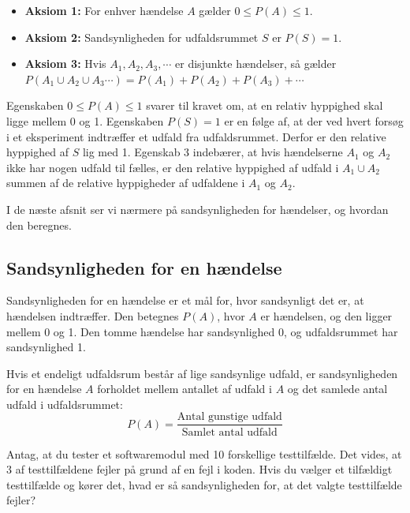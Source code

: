 \begin{axiom}
    \begin{itemize}
        \item \textbf{Aksiom 1:} For enhver hændelse \(A\) gælder \( 0 \leq P(A) \leq 1 \).
        \item \textbf{Aksiom 2:} Sandsynligheden for udfaldsrummet \(S\) er \(P(S) = 1\).
        \item \textbf{Aksiom 3:} Hvis \(A_1, A_2, A_3, \cdots\) er disjunkte hændelser, så gælder \(P\left(A_1 \cup A_2 \cup A_3 \cdots\right) = P\left(A_1\right) + P\left(A_2\right) + P\left(A_3\right) + \cdots\)
    \end{itemize}
\end{axiom}

Egenskaben \( 0 \leq P(A) \leq 1 \) svarer til kravet om, at en relativ hyppighed skal ligge mellem 0 og 1. Egenskaben \( P(S) = 1 \) er en følge af, at der ved hvert forsøg i et eksperiment indtræffer et udfald fra udfaldsrummet. Derfor er den relative hyppighed af \( S \) lig med 1. Egenskab 3 indebærer, at hvis hændelserne \( A_1 \) og \( A_2 \) ikke har nogen udfald til fælles, er den relative hyppighed af udfald i \( A_1 \cup A_2 \) summen af de relative hyppigheder af udfaldene i \( A_1 \) og \( A_2 \).

I de næste afsnit ser vi nærmere på sandsynligheden for hændelser, og hvordan den beregnes.

\subsection*{Sandsynligheden for en hændelse}
Sandsynligheden for en hændelse er et mål for, hvor sandsynligt det er, at hændelsen indtræffer. Den betegnes \( P(A) \), hvor \( A \) er hændelsen, og den ligger mellem 0 og 1. Den tomme hændelse har sandsynlighed 0, og udfaldsrummet har sandsynlighed 1.

\begin{definition}
    Hvis et endeligt udfaldsrum består af lige sandsynlige udfald, er sandsynligheden for en hændelse \( A \) forholdet mellem antallet af udfald i \(A\) og det samlede antal udfald i udfaldsrummet:
    \[
    P(A) = \frac{\text{Antal gunstige udfald}}{\text{Samlet antal udfald}}
    \]
\end{definition}

\begin{example}
    Antag, at du tester et softwaremodul med 10 forskellige testtilfælde. Det vides, at 3 af testtilfældene fejler på grund af en fejl i koden. Hvis du vælger et tilfældigt testtilfælde og kører det, hvad er så sandsynligheden for, at det valgte testtilfælde fejler?
\end{example}

